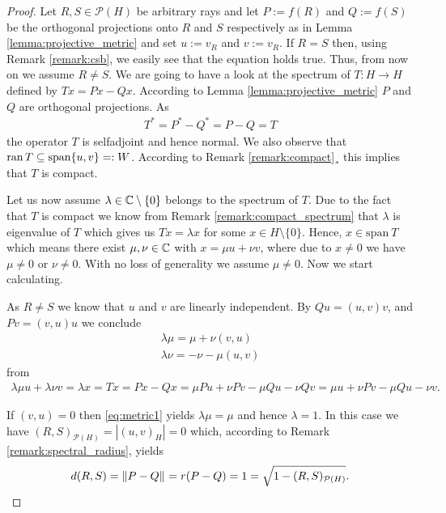 \begin{proof}
	Let $R,S \in\mathcal{P}(H)$ be arbitrary rays and let $P := f(R)$ and $Q:= f(S)$ be the orthogonal projections onto $R$ and $S$ respectively as in Lemma \ref{lemma:projective_metric} and set $u := v_R$ and $v := v_R$. If $R = S$ then, using Remark \ref{remark:csb}, we easily see that the equation holds true. Thus, from now on we assume $R \neq S$. We are going to have a look at the spectrum of $T: H \to H$ defined by $Tx = Px - Qx$. According to Lemma \ref{lemma:projective_metric} $P$ and $Q$ are orthogonal projections. As
	\begin{align*}
		T^\ast = P^\ast - Q^\ast = P - Q = T
	\end{align*}
	the operator $T$ is selfadjoint and hence normal. We also observe that $\operatorname{ran} T \subseteq \mathrm{span}\{u, v\} =: W$. According to Remark \ref{remark:compact}¸ this implies that $T$ is compact.
	
	Let us now assume $\lambda \in \mathbb{C} \setminus \{0\}$ belongs to the spectrum of $T$. Due to the fact that $T$ is compact we know from Remark \ref{remark:compact_spectrum} that $\lambda$ is eigenvalue of $T$ which gives us $T x = \lambda x$ for some $x \in H \setminus \{0\}$. Hence, $x \in \mathrm{span 
	}\ T$ which means there exist $\mu, \nu \in \mathbb{C}$ with $x = \mu u + \nu v$, where due to $x \neq 0$ we have $\mu \neq 0$ or $\nu \neq 0$. With no loss of generality we assume $\mu \neq 0$. Now we start calculating.
	
	As $R \neq S$ we know that $u$ and $v$ are linearly independent. By $Qu = (u,v) v$, and $Pv = (v,u) u$ we conclude
	\begin{align}
		\lambda \mu  = \mu  + \nu (v,u) \label{eq:metric1}\\
		 \lambda \nu  = - \nu  - \mu (u,v) \label{eq:metric2}
	\end{align}
	from
	\begin{align*}
		\lambda \mu u + \lambda \nu v = \lambda x = Tx = Px - Qx = \mu Pu + \nu Pv - \mu Qu - \nu Qv = \mu u + \nu Pv - \mu Qu - \nu v .
	\end{align*}
	
	If $(v,u) = 0$ then \eqref{eq:metric1} yields $\lambda \mu = \mu$ and hence $\lambda = 1$. In this case we have $(R,S)_{\mathcal{P}(H)} = |(u,v)_H| = 0$ which, according to Remark \ref{remark:spectral_radius}, yields 
	\begin{align*}
		d(R,S) = {\left \| P - Q \right \|}_{} = r(P - Q) = 1 = \sqrt{1 - (R,S)_{\mathcal{P}(H)}}.
	\end{align*}
	

\end{proof}
